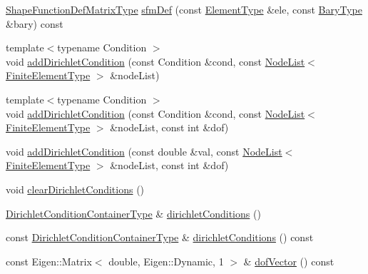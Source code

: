 \begin{DoxyCompactItemize}
\item 
\hyperlink{classmodel_1_1_trial_function_a91023734ad775d5608a8672e9fe00f5c}{Shape\+Function\+Def\+Matrix\+Type} \hyperlink{classmodel_1_1_trial_function_af721b91de8f83770471816cabe86f8dc}{sfm\+Def} (const \hyperlink{classmodel_1_1_trial_function_a72000c5b5030b4738f1d54f149519a78}{Element\+Type} \&ele, const \hyperlink{classmodel_1_1_trial_function_af4bd713419cc83660594065c9392bf2c}{Bary\+Type} \&bary) const 
\item 
{\footnotesize template$<$typename Condition $>$ }\\void \hyperlink{classmodel_1_1_trial_function_a88905f263222a71a39550e16b491764f}{add\+Dirichlet\+Condition} (const Condition \&cond, const \hyperlink{structmodel_1_1_node_list}{Node\+List}$<$ \hyperlink{classmodel_1_1_trial_function_affdabe3315d0208c9b2210c3cbee6d42}{Finite\+Element\+Type} $>$ \&node\+List)
\item 
{\footnotesize template$<$typename Condition $>$ }\\void \hyperlink{classmodel_1_1_trial_function_af3f003bde72d04367fca04898c50546b}{add\+Dirichlet\+Condition} (const Condition \&cond, const \hyperlink{structmodel_1_1_node_list}{Node\+List}$<$ \hyperlink{classmodel_1_1_trial_function_affdabe3315d0208c9b2210c3cbee6d42}{Finite\+Element\+Type} $>$ \&node\+List, const int \&dof)
\item 
void \hyperlink{classmodel_1_1_trial_function_a7756c68f422979e2123d3eff9baadfad}{add\+Dirichlet\+Condition} (const double \&val, const \hyperlink{structmodel_1_1_node_list}{Node\+List}$<$ \hyperlink{classmodel_1_1_trial_function_affdabe3315d0208c9b2210c3cbee6d42}{Finite\+Element\+Type} $>$ \&node\+List, const int \&dof)
\item 
void \hyperlink{classmodel_1_1_trial_function_a59298a9f8016e1a20d466cebac09bebf}{clear\+Dirichlet\+Conditions} ()
\item 
\hyperlink{classmodel_1_1_trial_function_ae83a85333510ff0e0823e6cb748774ed}{Dirichlet\+Condition\+Container\+Type} \& \hyperlink{classmodel_1_1_trial_function_a8cb248e12ec072e4edaf7c43610926ea}{dirichlet\+Conditions} ()
\item 
const \hyperlink{classmodel_1_1_trial_function_ae83a85333510ff0e0823e6cb748774ed}{Dirichlet\+Condition\+Container\+Type} \& \hyperlink{classmodel_1_1_trial_function_ad9215ddbadde33a8393e55d371d51b1a}{dirichlet\+Conditions} () const 
\item 
const Eigen\+::\+Matrix$<$ double, Eigen\+::\+Dynamic, 1 $>$ \& \hyperlink{classmodel_1_1_trial_function_a84bca00103b11310f2b15c906f566670}{dof\+Vector} () const 

\end{DoxyCompactItemize}
